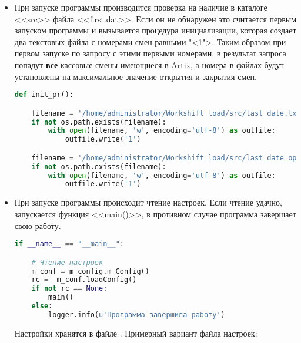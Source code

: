 \begin{itemize}

\item При запуске программы производится проверка на наличие в каталоге <<src>> файла
<<first.dat>>. Если он не обнаружен это считается первым запуском программы и вызывается процедура инициализации, которая создает два текстовых файла с номерами смен равными "<1">. Таким образом при первом запуске по запросу с этими первыми номерами, в результат запроса попадут \textbf{все} кассовые смены имеющиеся в Artix, а номера в файлах будут установлены на максимальное значение открытия и закрытия смен.
\newline


	\begin{lstlisting}[language=Python, label=some-code,caption=Инициализация файлов с датами]
def init_pr():

	filename = '/home/administrator/Workshift_load/src/last_date.txt'
	if not os.path.exists(filename):
		with open(filename, 'w', encoding='utf-8') as outfile:
			outfile.write('1')

	filename = '/home/administrator/Workshift_load/src/last_date_open.txt'
	if not os.path.exists(filename):
		with open(filename, 'w', encoding='utf-8') as outfile:
			outfile.write('1')
			   	\end{lstlisting}


	
\item При запуске программы происходит чтение настроек. Если чтение удачно, запускается функция <<main()>>, в противном случае программа завершает свою работу.
\newline




	\begin{lstlisting}[language=Python, caption=Начало работы]
if __name__ == "__main__":

	# Чтение настроек
	m_conf = m_config.m_Config()   
	rc =  m_conf.loadConfig()
	if not rc == None:
		main()
	else:
		logger.info(u'Программа завершила работу') 
	\end{lstlisting}


\newpage

Настройки хранятся в файле  . Примерный вариант файла настроек:



\end{itemize}
